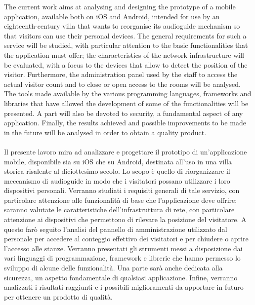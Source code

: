 The current work aims at analysing and designing the prototype of a mobile application, available both on iOS and Android, intended for use by an eighteenth-century villa that wants to reorganise its audioguide mechanism so that visitors can use their personal devices.
The general requirements for such a service will be studied, with particular attention to the basic functionalities that the application must offer; the characteristics of the network infrastructure will be evaluated, with a focus to the devices that allow to detect the position of the visitor. Furthermore, the administration panel used by the staff to access the actual visitor count and to close or open access to the rooms will be analysed. The tools made available by the various programming languages, frameworks and libraries that have allowed the development of some of the functionalities will be presented. A part will also be devoted to security, a fundamental aspect of any application. Finally, the results achieved and possible improvements to be made in the future will be analysed in order to obtain a quality product.\\\\
Il presente lavoro mira ad analizzare e progettare il prototipo di un'applicazione mobile, disponibile sia su iOS che su Android, destinata all'uso in una villa storica risalente al diciottesimo secolo. Lo scopo è quello di riorganizzare il meccanismo di audioguide in modo che i visitatori possano utilizzare i loro dispositivi personali.
Verranno studiati i requisiti generali di tale servizio, con particolare attenzione alle funzionalità di base che l'applicazione deve offrire; saranno valutate le caratteristiche dell'infrastruttura di rete, con particolare attenzione ai dispositivi che permettono di rilevare la posizione del visitatore. A questo farò seguito l'analisi del pannello di amministrazione utilizzato dal personale per accedere al conteggio effettivo dei visitatori e per chiudere o aprire l'accesso alle stanze. 
Verranno presentati gli strumenti messi a disposizione dai vari linguaggi di programmazione, framework e librerie che hanno permesso lo sviluppo di alcune delle funzionalità. Una parte sarà anche dedicata alla sicurezza, un aspetto fondamentale di qualsiasi applicazione. Infine, verranno analizzati i risultati raggiunti e i possibili miglioramenti da apportare in futuro per ottenere un prodotto di qualità.

